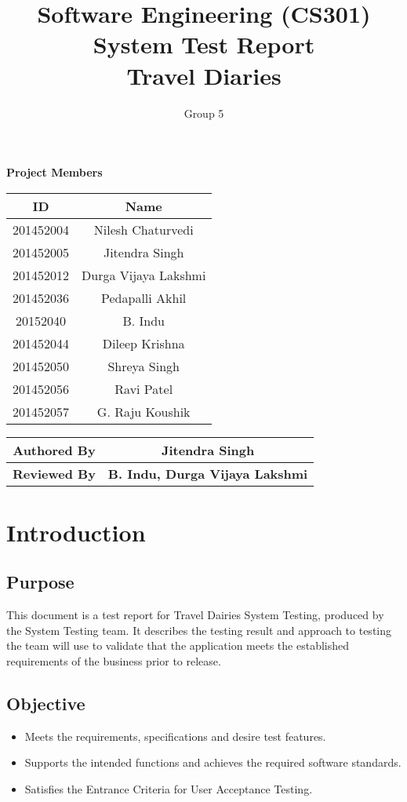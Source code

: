 \documentclass[]{article}
\title{Software Engineering (CS301)\\ System Test Report\\Travel Diaries}
\author{Group 5}
\begin{document}
\maketitle


\begin{center}
\textbf{Project Members}\\
\vspace*{.6cm}
\begin{tabular}{|c|c|}
\hline
\textbf{ID} & \textbf{Name}\\
\hline
\hline
201452004 & Nilesh Chaturvedi\\
\hline
201452005 & Jitendra Singh\\
\hline
201452012 & Durga Vijaya Lakshmi\\
\hline
201452036 & Pedapalli Akhil\\
\hline
20152040 & B. Indu\\
\hline
201452044 & Dileep Krishna\\
\hline
201452050 & Shreya Singh\\
\hline
201452056 & Ravi Patel\\
\hline
201452057 & G. Raju Koushik\\
\hline
\end{tabular}

\vspace*{1cm}

\begin{tabular}{|c|c|}
\hline
\textbf{Authored By} & \textbf{Jitendra Singh}\\
\hline
\textbf{Reviewed By} & \textbf{B. Indu, Durga Vijaya Lakshmi }\\
\hline
\end{tabular}
\end{center}

\newpage
\tableofcontents
\newpage


\section{Introduction}
\subsection{Purpose}
This document is a test report for Travel Dairies  System Testing, produced by the System Testing team.  It describes the testing result and approach to testing the team will use to validate that the application meets the established requirements of the business prior to release.
\subsection{Objective}
\begin{itemize}
\item Meets the requirements, specifications and desire test features.
\item Supports the intended functions and achieves the required software standards.
\item Satisfies the Entrance Criteria for User Acceptance Testing.
\end{itemize}
\end{document}
